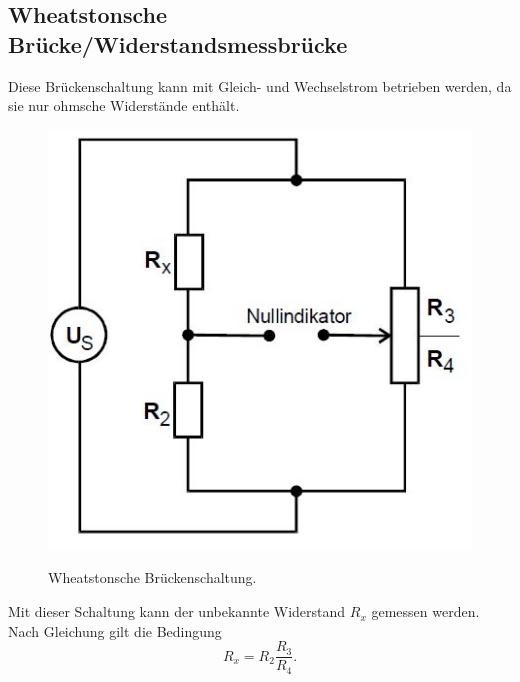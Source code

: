 \subsection{Wheatstonsche Brücke/Widerstandsmessbrücke}
\noindent Diese Brückenschaltung kann mit Gleich- und Wechselstrom betrieben werden,
da sie nur ohmsche Widerstände enthält.
\begin{figure}[H]
  \centering
  \includegraphics{widerstand.JPG}
  \caption{Wheatstonsche Brückenschaltung.}
  \label{fig:widerstand}
  \cite{skript}
\end{figure}

\noindent Mit dieser Schaltung kann der unbekannte Widerstand $R_{x}$ gemessen werden.
Nach Gleichung  gilt die Bedingung
\begin{equation}
  R_{x}= R_{2}\frac{R_{3}}{R_{4}}.
  \label{eqn:rx}
\end{equation}
